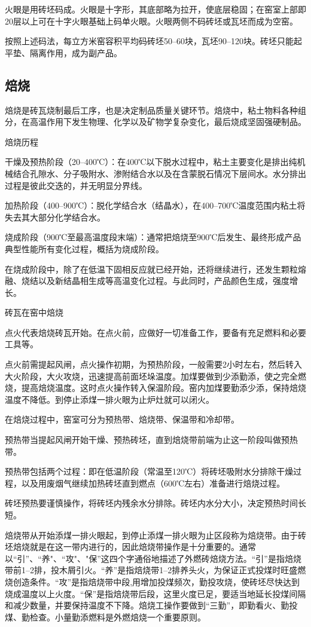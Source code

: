 \documentclass{ctexbook}
\begin{document}
火眼是用砖坯码成。火眼是十字形，其底部略为拉开，使底层稳固；在窑室上部即20层以上可在十字火眼基础上码单火眼。火眼两侧不码砖坯或瓦坯而成为空窑。

按照上述码法，每立方米窑容积平均码砖坯50--60块，瓦坯90--120块。砖坯只能起平垫、隔离作用，成为副产品。
\subsection{焙烧}
焙烧是砖瓦烧制最后工序，也是决定制品质量关键环节。焙烧中，粘土物料各种组分，在高温作用下发生物理、化学以及矿物学复杂变化，最后烧成坚固强硬制品。

焙烧历程

干燥及预热阶段（20--400℃）：在400℃以下脱水过程中，粘土主要变化是排出纯机械结合孔隙水、分子吸附水、渗附结合水以及在含蒙脱石情况下层间水。水分排出过程是彼此交迭的，并无明显分界线。

加热阶段（400--900℃）：脱化学结合水（结晶水），在400--700℃温度范围内粘土将失去其大部分化学结合水。

烧成阶段（900℃至最高温度段末端）：通常把焙烧至900℃后发生、最终形成产品典型性能所有变化过程，概括为烧成阶段。

在烧成阶段中，除了在低温下固相反应就已经开始，还将继续进行，还发生颗粒熔融、烧结以及新结晶相生成等高温变化过程。与此同时，产品颜色生成，强度增长。

砖瓦在窑中焙烧

点火代表焙烧砖瓦开始。在点火前，应做好一切准备工作，要备有充足燃料和必要工具等。

点火前需提起风闸，点火操作初期，为预热阶段，一般需要2小时左右，然后转入大火阶段，大火攻烧，迅速提高前面坯垛温度。加煤要做到少添勤添，使之完全燃烧，提高焙烧温度。这时点火操作转入保温阶段。窑内加煤要勤添少添，保持焙烧温度不降低。到停止添煤一排火眼为止炉灶就可以闭火。

在焙烧过程中，窑室可分为预热带、焙烧带、保温带和冷却带。

预热带当提起风闸开始干燥、预热砖坯，直到焙烧带前端为止这一阶段叫做预热带。

预热带包括两个过程：即在低温阶段（常温至120℃）将砖坯吸附水分排除干燥过程，以及用废烟气继续加热砖坯直到燃点（600℃左右）准备进行焙烧过程。

砖坯预热要谨慎操作，将砖坯内残余水分排除。砖坯内水分大小，决定预热时间长短。

焙烧带从开始添煤一排火眼起，到停止添煤一排火眼为止区段称为焙烧带。由于砖坯焙烧就是在这一带内进行的，因此焙烧带操作是十分重要的。通常以“引”、“养"、“攻"、"保”这四个字通俗地描述了外燃砖焙烧方法。“引”是指焙烧带前1--2排，投木屑引火。“养”是指焙烧带1--2排养头火，为保证正式投煤时旺盛燃烧创造条件。“攻”是指焙烧带中段,用增加投煤频次，勤投攻烧，使砖坯尽快达到烧成温度以上火度。“保”是指焙烧带后段，这里火度已足，要适当地延长投煤间隔和减少数量，并要保持温度不下降。焙烧工操作要做到“三勤”，即勤看火、勤投煤、勤检查。小量勤添燃料是外燃焙烧一个重要原则。
\end{document}
